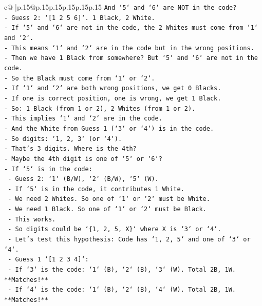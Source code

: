 \documentclass{article}
\begin{document}
{\begin{supertabular}{c@{$\;$}|p{.15\linewidth}@{}p{.15\linewidth}p{.15\linewidth}p{.15\linewidth}p{.15\linewidth}p{.15\linewidth}}
{{{\texttt{And `5` and `6` are NOT in the code?} \\
\texttt{{-} Guess 2: `{[}1 2 5 6{]}`. 1 Black, 2 White.} \\
\texttt{{-} If `5` and `6` are not in the code, the 2 Whites must come from `1` and `2`.} \\
\texttt{{-} This means `1` and `2` are in the code but in the wrong positions.} \\
\texttt{{-} Then we have 1 Black from somewhere? But `5` and `6` are not in the code.} \\
\texttt{{-} So the Black must come from `1` or `2`.} \\
\texttt{{-} If `1` and `2` are both wrong positions, we get 0 Blacks.} \\
\texttt{{-} If one is correct position, one is wrong, we get 1 Black.} \\
\texttt{{-} So: 1 Black (from 1 or 2), 2 Whites (from 1 or 2).} \\
\texttt{{-} This implies `1` and `2` are in the code.} \\
\texttt{{-} And the White from Guess 1 (`3` or `4`) is in the code.} \\
\texttt{{-} So digits: `1, 2, 3` (or `4`).} \\
\texttt{{-} That's 3 digits. Where is the 4th?} \\
\texttt{{-} Maybe the 4th digit is one of `5` or `6`?} \\
\texttt{{-} If `5` is in the code:} \\
\texttt{    {-} Guess 2: `1` (B/W), `2` (B/W), `5` (W).} \\
\texttt{    {-} If `5` is in the code, it contributes 1 White.} \\
\texttt{    {-} We need 2 Whites. So one of `1` or `2` must be White.} \\
\texttt{    {-} We need 1 Black. So one of `1` or `2` must be Black.} \\
\texttt{    {-} This works.} \\
\texttt{    {-} So digits could be `\{1, 2, 5, X\}` where X is `3` or `4`.} \\
\texttt{    {-} Let's test this hypothesis: Code has `1, 2, 5` and one of `3` or `4`.} \\
\texttt{    {-} Guess 1 `{[}1 2 3 4{]}`:} \\
\texttt{        {-} If `3` is the code: `1` (B), `2` (B), `3` (W). Total 2B, 1W. **Matches!**} \\
\texttt{        {-} If `4` is the code: `1` (B), `2` (B), `4` (W). Total 2B, 1W. **Matches!**} \\
}}}
\end{supertabular}}
\end{document}
